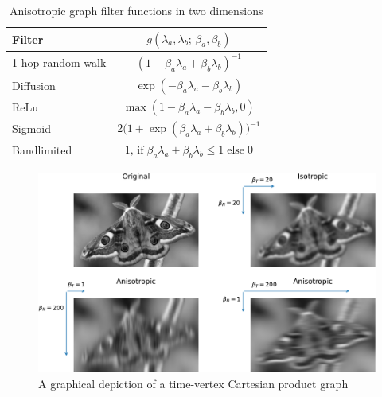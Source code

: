 \begin{table}[t]
    \def\arraystretch{1.7}
    \small
    \begin{center}
        \begin{tabular}{|l|c|}
            \hline
            \textbf{Filter}   & $g(\lambda_a, \lambda_b; \,\beta_a, \beta_b)$                                            \\
            \hline
            1-hop random walk & $(1 + \beta_a \lambda_a + \beta_b \lambda_b)^{-1}$                                   \\
            \hline
            Diffusion         & $\exp(-\beta_a \lambda_a - \beta_b \lambda_b)$                                       \\
            \hline
            ReLu              & $\max (1 - \beta_a \lambda_a - \beta_b \lambda_b, 0)$                                \\
            \hline
            Sigmoid           & $2 \big( 1 + \exp(\beta_a \lambda_a + \beta_b \lambda_b)\big)^{-1}$                  \\
            \hline
            Bandlimited       & $1, \,\text{if} \; \beta_a \lambda_a + \beta_b \lambda_b\leq 1 \; \text{else} \; 0$ \\
            \hline
        \end{tabular}
    \end{center}
    \caption{Anisotropic graph filter functions in two dimensions}
    \label{tab:anis_filters_2d}
\end{table}


\begin{figure}[t]
    \includegraphics[width=0.9\linewidth]{Figures/filter_types_butterfly.pdf}
    \caption[A time-vertex Cartesian product graph]{A graphical depiction of a time-vertex Cartesian product graph}
    \label{fig:filters}
\end{figure}



